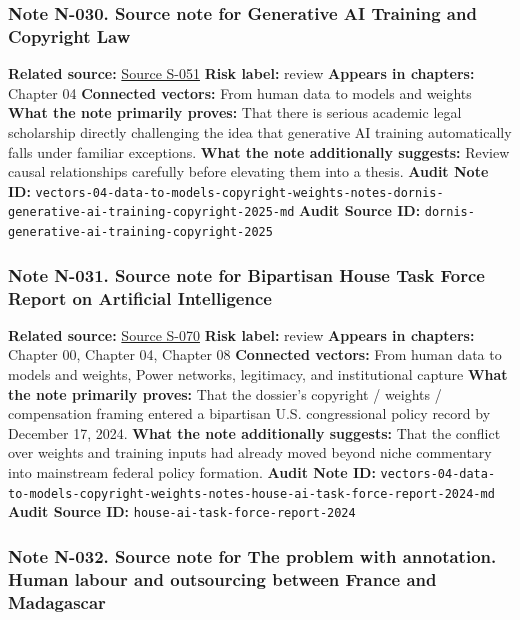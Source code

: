 \documentclass[
  american,
  11pt,
  letterpaper,
]{article}
\begin{document}
\subsubsection{Note N-030. Source note for Generative AI Training and
Copyright
Law}\label{note-n-030-vectors-04-data-to-models-copyright-weights-notes-dornis-generative-ai-training-copyright-2025-md}

\textbf{Related source:}
\hyperref[source-s-051-generative-ai-training-and-copyright-law]{Source
S-051} \textbf{Risk label:} review \textbf{Appears in chapters:} Chapter
04 \textbf{Connected vectors:} From human data to models and weights
\textbf{What the note primarily proves:} That there is serious academic
legal scholarship directly challenging the idea that generative AI
training automatically falls under familiar exceptions. \textbf{What the
note additionally suggests:} Review causal relationships carefully
before elevating them into a thesis. \textbf{Audit Note ID:}
\texttt{vectors-04-data-to-models-copyright-weights-notes-dornis-generative-ai-training-copyright-2025-md}
\textbf{Audit Source ID:}
\texttt{dornis-generative-ai-training-copyright-2025}

\subsubsection{Note N-031. Source note for Bipartisan House Task Force
Report on Artificial
Intelligence}\label{note-n-031-vectors-04-data-to-models-copyright-weights-notes-house-ai-task-force-report-2024-md}

\textbf{Related source:}
\hyperref[source-s-070-bipartisan-house-task-force-report-on-artificial-intelligence]{Source
S-070} \textbf{Risk label:} review \textbf{Appears in chapters:} Chapter
00, Chapter 04, Chapter 08 \textbf{Connected vectors:} From human data
to models and weights, Power networks, legitimacy, and institutional
capture \textbf{What the note primarily proves:} That the dossier's
copyright / weights / compensation framing entered a bipartisan U.S.
congressional policy record by December 17, 2024. \textbf{What the note
additionally suggests:} That the conflict over weights and training
inputs had already moved beyond niche commentary into mainstream federal
policy formation. \textbf{Audit Note ID:}
\texttt{vectors-04-data-to-models-copyright-weights-notes-house-ai-task-force-report-2024-md}
\textbf{Audit Source ID:} \texttt{house-ai-task-force-report-2024}

\subsubsection{Note N-032. Source note for The problem with annotation.
Human labour and outsourcing between France and
Madagascar}\label{note-n-032-vectors-04-data-to-models-copyright-weights-notes-le-ludec-cornet-casilli-annotation-madagascar-2023-md}
\end{document}
